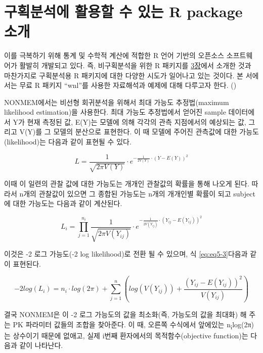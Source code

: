 \documentclass[
  11pt,
  krantz2, a4paper, twoside]{krantz}
\theoremstyle{definition}
\theoremstyle{definition}
\theoremstyle{definition}
\theoremstyle{definition}
\theoremstyle{remark}
\begin{document}
\section{구획분석에 활용할 수 있는 R package 소개}\label{uxad6cuxd68duxbd84uxc11duxc5d0-uxd65cuxc6a9uxd560-uxc218-uxc788uxb294-r-package-uxc18cuxac1c}

이를 극복하기 위해 통계 및 수학적 계산에 적합한 R 언어 기반의 오픈소스 소프트웨어가 활발히 개발되고 있다.
즉, 비구획분석을 위한 R 패키지를 \hyperref[nca-analysis]{3장}에서 소개한 것과 마찬가지로 구획분석용 R 패키지에 대한 다양한 시도가 일어나고 있는 것이다.
본 서에서는 무료 R 패키지 ``wnl''를 사용한 자료해석과 예제에 대해 다루고자 한다. ()

NONMEM에서는 비선형 회귀분석을 위해서 최대 가능도 추정법(maximum likelihood estimation)을 사용한다. 
최대 가능도 추정법에서 얻어진 sample 데이터에서 Y가 현재 측정된 값, E(Y)는 모델에 의해 각각의 관측 지점에서의 예상되는 값, 그리고 V(Y)를 그 모델의 분산으로 표현한다. 
이 때 모델에 주어진 관측값에 대한 가능도(likelihood)는 다음과 같이 표현될 수 있다.

\begin{equation}
L = \frac{1}{\sqrt{2\pi V(Y)}} \cdot e^{-\frac{1}{2V(Y)}\cdot(Y-E(Y))^2}
\label{eq:eq5-1}
\end{equation}

이때 이 일련의 관찰 값에 대한 가능도는 개개인 관찰값의 확률을 통해 나오게 된다. 
따라서 n개의 관찰값이 있으면 그 종합된 가능도는 n개의 개개인별 확률이 되고 subject에 대한 가능도는 다음과 같이 계산된다.

\begin{equation}
L_i = \prod_{j=1}^{n_i}\frac{1}{\sqrt{2\pi V(Y_{ij})}} \cdot e^{-\frac{1}{2V(Y_{ij})}\cdot(Y_{ij}-E(Y_{ij}))^2}
\label{eq:eq5-2}
\end{equation}

이것은 -2 로그 가능도(-2 log likelihood)로 전환 될 수 있으며, 식 \eqref{eq:eq5-3}다음과 같이 표현된다.

\begin{equation}
-2log(L_i) = n_i \cdot log(2\pi) + \sum_{j=1}^{n}(log(V(Y_{ij}))+ \frac{(Y_{ij} - E(Y_{ij}))^2}{V(Y_{ij})})
\label{eq:eq5-3}
\end{equation}

결국 NONMEM은 이 -2 로그 가능도의 값을 최소화(즉, 가능도의 값을 최대화) 해 주는 PK 파라미터 값들의 조합을 찾아준다.
이 때, 오른쪽 수식에서 앞에있는 n\textsubscript{i}log(2π)는 상수이기 때문에 없애고, 실제 i번째 환자에서의 목적함수(objective function)는 다음과 같이 나타난다.
\end{document}
